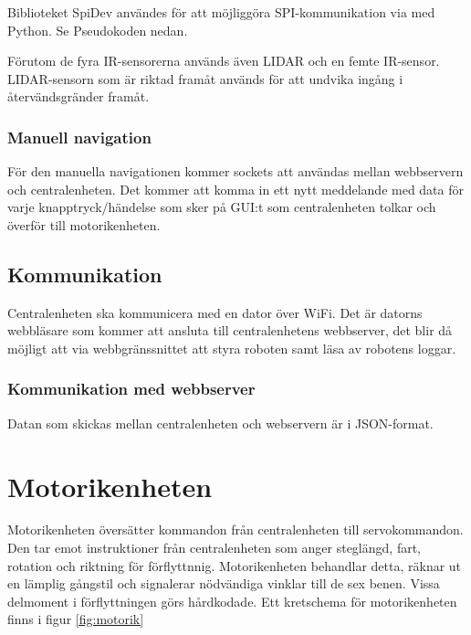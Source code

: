 \documentclass[a4paper,titlepage,12pt]{article}
\begin{document}
    Biblioteket SpiDev användes för att möjliggöra SPI-kommunikation via med
    Python. Se Pseudokoden nedan.


    Förutom de fyra IR-sensorerna används även LIDAR och en femte IR-sensor.
    LIDAR-sensorn som är riktad framåt används för att undvika ingång i
    återvändsgränder framåt. 
    
    \subsubsection{Manuell navigation}
    För den manuella navigationen kommer sockets att användas mellan webbservern
    och centralenheten. Det kommer att komma in ett nytt meddelande med data för varje
    knapptryck/händelse som sker på GUI:t som centralenheten tolkar och överför
    till motorikenheten. 

	\subsection{Kommunikation}
	Centralenheten ska kommunicera med en dator över WiFi. Det är datorns webbläsare 
	som kommer att ansluta till centralenhetens webbserver, det blir då möjligt att
	via webbgränssnittet att styra roboten samt läsa av robotens loggar. 	
	\subsubsection{Kommunikation med webbserver}
	Datan som skickas mellan centralenheten och webservern är i JSON-format.

    \newpage
	\section{Motorikenheten}
	Motorikenheten översätter kommandon från centralenheten till servokommandon. Den tar emot 
	instruktioner från centralenheten som anger steglängd, fart, rotation och riktning för 
	förflyttnnig. Motorikenheten behandlar detta, räknar ut en lämplig gångstil och 
	signalerar nödvändiga vinklar till de sex benen. Vissa delmoment i förflyttningen 
	görs hårdkodade. Ett kretschema för motorikenheten finns i figur \ref{fig:motorik}
\end{document}

